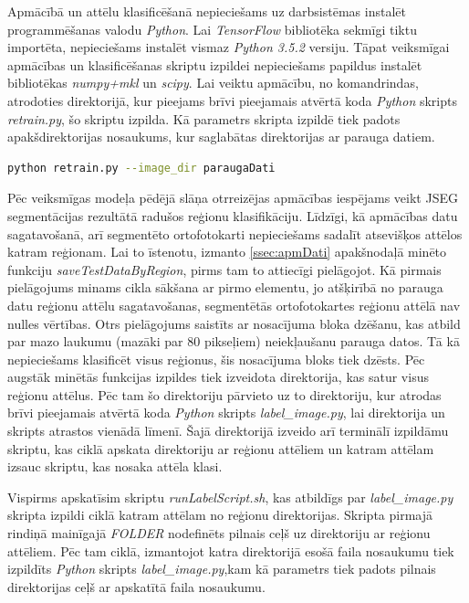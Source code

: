 \documentclass[12pt,paper=a4]{report}
\begin{document}
Apmācībā un attēlu klasificēšanā nepieciešams uz darbsistēmas instalēt programmēšanas valodu \textit{Python}. Lai \textit{TensorFlow} bibliotēka sekmīgi tiktu importēta, nepieciešams instalēt vismaz  \textit{Python 3.5.2} versiju. Tāpat veiksmīgai apmācības un klasificēšanas skriptu izpildei nepieciešams papildus instalēt bibliotēkas \textit{numpy+mkl} un \textit{scipy}. Lai veiktu apmācību, no komandrindas, atrodoties direktorijā, kur pieejams brīvi pieejamais atvērtā koda \textit{Python} skripts \textit{retrain.py}, šo skriptu izpilda. Kā parametrs skripta izpildē tiek padots apakšdirektorijas nosaukums, kur saglabātas direktorijas ar parauga datiem.
\begin{lstlisting}[language=bash]
python retrain.py --image_dir paraugaDati
\end{lstlisting}\par
Pēc veiksmīgas modeļa pēdējā slāņa otrreizējas apmācības iespējams veikt JSEG segmentācijas rezultātā radušos reģionu klasifikāciju. Līdzīgi, kā apmācības datu sagatavošanā, arī segmentēto ortofotokarti nepieciešams sadalīt atsevišķos attēlos katram reģionam. Lai to īstenotu, izmanto \ref{ssec:apmDati} apakšnodaļā minēto funkciju \textit{saveTestDataByRegion}, pirms tam to attiecīgi pielāgojot. Kā pirmais pielāgojums minams cikla sākšana ar pirmo elementu, jo atšķirībā no parauga datu reģionu attēlu sagatavošanas, segmentētās ortofotokartes reģionu attēlā nav nulles vērtības. Otrs pielāgojums saistīts ar nosacījuma bloka dzēšanu, kas atbild par mazo laukumu (mazāki par 80 pikseļiem) neiekļaušanu parauga datos. Tā kā nepieciešams klasificēt visus reģionus, šis nosacījuma bloks tiek dzēsts. Pēc augstāk minētās funkcijas izpildes tiek izveidota direktorija, kas satur visus reģionu attēlus. Pēc tam šo direktoriju pārvieto uz to direktoriju, kur atrodas brīvi pieejamais atvērtā koda \textit{Python} skripts \textit{label_image.py}, lai direktorija un skripts atrastos vienādā līmenī. Šajā direktorijā izveido arī terminālī izpildāmu skriptu, kas ciklā apskata direktoriju ar reģionu attēliem un katram attēlam izsauc skriptu, kas nosaka attēla klasi.\par
Vispirms apskatīsim skriptu \textit{runLabelScript.sh}, kas atbildīgs par \textit{label_image.py} skripta izpildi ciklā katram attēlam no reģionu direktorijas. Skripta pirmajā rindiņā mainīgajā \textit{FOLDER} nodefinēts pilnais ceļš uz direktoriju ar reģionu attēliem. Pēc tam ciklā, izmantojot katra direktorijā esošā faila nosaukumu tiek izpildīts \textit{Python} skripts \textit{label_image.py},kam kā parametrs tiek padots pilnais direktorijas ceļš ar apskatītā faila nosaukumu. 
\end{document}

